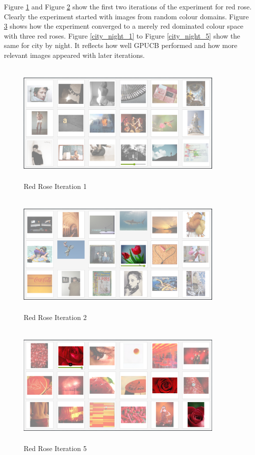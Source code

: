 \documentclass[english]{tktltiki}
\begin{document}
Figure \ref{red_rose_1} and Figure \ref{red_rose_2} show the first two iterations of the experiment for red rose. Clearly the experiment started with images from random colour domains. Figure \ref{red_rose_5} shows how the experiment converged to a merely red dominated colour space with three red roses. Figure \ref{city_night_1} to Figure \ref{city_night_5} show the same for city by night. It reflects how well GPUCB performed and how more relevant images appeared with later iterations.
\begin{figure}[!h]
  \centering
    \includegraphics[width=0.90\textwidth,height=6cm]{figures/Rose_1.png}
    \caption{Red Rose Iteration 1}
    \label{red_rose_1}
\end{figure}

\begin{figure}[h!]
  \centering
    \includegraphics[width=0.90\textwidth,height=6cm]{figures/Rose_2.png}
    \caption{Red Rose Iteration 2}
    \label{red_rose_2}
\end{figure}

\begin{figure}[h!]
  \centering
    \includegraphics[width=0.90\textwidth,height=6cm]{figures/Rose_5.png}
    \caption{Red Rose Iteration 5}
    \label{red_rose_5}
\end{figure}
\end{document}
